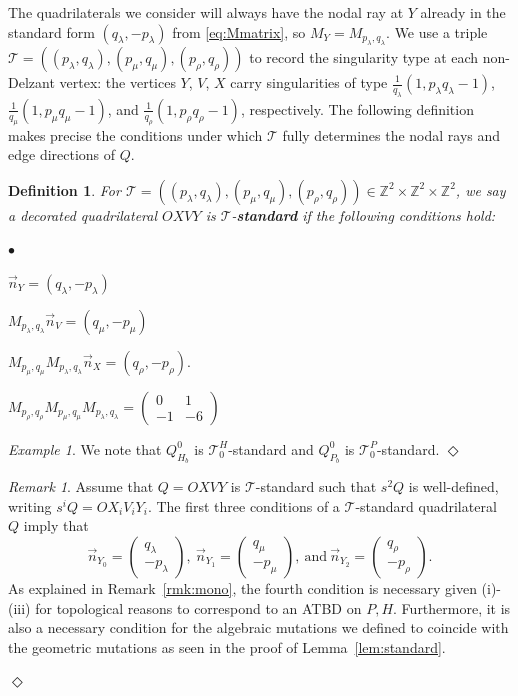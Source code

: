 \documentclass[11pt, reqno]{amsart}
\newtheorem{definition}[thm]{Definition}
\theoremstyle{remark}
\numberwithin{equation}{subsection}
\numberwithin{figure}{section}
\theoremstyle{customremark}
\newtheorem{rmk_no_diamond}[thm]{Remark}
\newenvironment{rmk}{\begin{rmk_no_diamond} } {\hfill$\er$ \end{rmk_no_diamond}}
\newtheorem{example_no_diamond}[thm]{Example}
\newenvironment{example}{\begin{example_no_diamond} } {\hfill$\er$ \end{example_no_diamond}}
\newcommand{\Tt}{\mathcal{T}}
\newenvironment{itemlist}
   { \begin{list} {$\bullet$}
         { \setlength{\topsep}{.5ex}  \setlength{\itemsep}{.5ex} \setlength{\leftmargin}{2.5ex} } }
   { \end{list} }
\newcommand{\vn}{{\vec{n}}}
\newcommand{\la}{{\lambda}}
\newcommand{\er}{{\Diamond}}
\newcommand{\Z}{\mathbb{Z}}
\begin{document}
The quadrilaterals we consider will always have the nodal ray at $Y$ already 
in the standard form $(q_\lambda, -p_\lambda)$ from \eqref{eq:Mmatrix}, so 
$M_Y = M_{p_\lambda, q_\lambda}$. We use a triple $\mathcal{T} = 
((p_\lambda, q_\lambda), (p_\mu, q_\mu), (p_\rho, q_\rho))$ to record the 
singularity type at each non-Delzant vertex: the vertices $Y$, $V$, $X$ carry 
singularities of type $\tfrac{1}{q_\lambda}(1, p_\lambda q_\lambda - 1)$, 
$\tfrac{1}{q_\mu}(1, p_\mu q_\mu - 1)$, and $\tfrac{1}{q_\rho}(1, p_\rho 
q_\rho - 1)$, respectively. The following definition makes precise the 
conditions under which $\mathcal{T}$ fully determines the nodal rays and edge 
directions of $Q$.


\begin{definition} \label{eq:tStandard}
For $\Tt=((p_\la,q_\la),(p_\mu,q_\mu),(p_\rho,q_\rho)) \in \Z^2 \times \Z^2 \times \Z^2$, we say a decorated quadrilateral $OXVY$ is $\Tt$-{\bf standard} if the following conditions hold: 
\begin{itemlist}
    \item[{i)}] $\vn_Y=(q_\la,-p_\la)$
    \item[{ii)}] $M_{p_\la,q_\la}\vn_V=(q_\mu,-p_\mu)$
    \item[{iii)}] $M_{p_\mu,q_\mu}M_{p_\la,q_\la}\vn_X=(q_\rho,-p_\rho).$
    \item[{iv)}] $M_{p_\rho,q_\rho}M_{p_\mu,q_\mu}M_{p_\la,q_\la}=\begin{pmatrix}
        0 & 1 \\ -1 & -6
    \end{pmatrix}$
\end{itemlist}

\end{definition}

\begin{example}
    We note that $Q_{H_b}^0$ is $\Tt_0^H$-standard and $Q_{P_b}^0$ is $\Tt_0^P$-standard. 
\end{example}


\begin{rmk}
    Assume that $Q=OXVY$ is $\Tt$-standard such that $s^2Q$ is well-defined, writing $s^iQ=OX_iV_iY_i$. The first three conditions of a $\Tt$-standard quadrilateral $Q$ imply that 
    \[\vn_{Y_0}=\begin{pmatrix}q_\la \\ -p_\la\end{pmatrix}, \ \vn_{Y_1}=\begin{pmatrix} q_\mu \\ -p_\mu\end{pmatrix}, \ \text{and} \ \vn_{Y_2}=\begin{pmatrix}q_\rho\\-p_\rho\end{pmatrix}.\] As explained in Remark~\ref{rmk:mono}, the fourth condition is necessary given (i)-(iii) for topological reasons to correspond to an ATBD on $P,H$. Furthermore, it is also a necessary condition for the algebraic mutations we defined to coincide with the geometric mutations as seen in the proof of Lemma~\ref{lem:standard}. 

 
\end{rmk}
\end{document}
